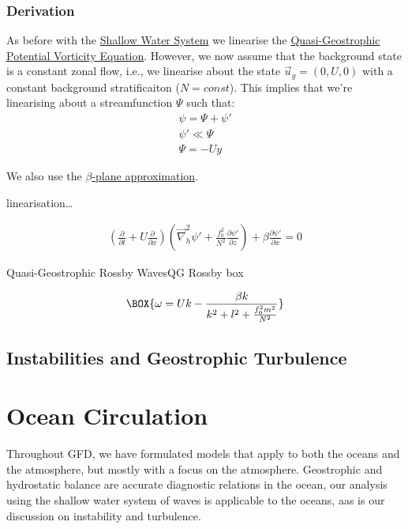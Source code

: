 \subsection{Derivation}

As before with the \hyperref[Shallow Water System]{Shallow Water System} we linearise the \hyperref[QGPV]{Quasi-Geostrophic Potential Vorticity Equation}. However, we now assume that the background state is a constant zonal flow, i.e., we linearise about the state $\vec{u}_g=(0,U,0)$ with a constant background stratificaiton ($N=const$). This implies that we're linearising about a streamfunction $\Psi$ such that:
\begin{align*}
    \psi = \Psi + \psi'
    \\
    \psi' \ll \Psi
    \\
    \Psi = -Uy
\end{align*}

We also use the \hyperref[beta plane box]{$\beta$-plane approximation}.

linearisation\dots

\begin{align*}
    \left( \frac{\partial }{\partial t}+U\frac{\partial }{\partial x} \right)
    \left( 
        \vec{\nabla}_h^2 \psi' 
        +\frac{f_0^2}{N^2}\frac{\partial \psi'}{\partial z}
     \right)
    +
    \beta \frac{\partial \psi' }{\partial x}
    =
    0
\end{align*}

\begin{fact}{Quasi-Geostrophic Rossby Waves}{QG Rossby box}\label{QG Rossby box}

    \begin{gather}
        \BOX{
            \omega = Uk - \frac{\beta k}{k^2 + l^2 +\frac{f_0^2 m^2}{N^2}}
        }
    \end{gather}
\end{fact}

\section{Instabilities and Geostrophic Turbulence}

\chapter{Ocean Circulation}\label{Oceans}

Throughout GFD, we have formulated models that apply to both the oceans and the atmosphere, but mostly with a focus on the atmosphere. Geostrophic and hydrostatic balance are accurate diagnostic relations in the ocean, our analysis using the shallow water system of waves is applicable to the oceans, aas is our discussion on instability and turbulence.

